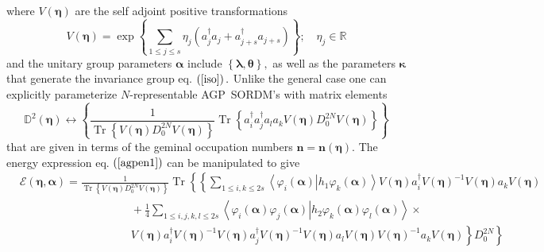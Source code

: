 \documentclass[aps,preprint]{revtex4}%
\begin{document}
where $V\left(  \mathbf{\eta}\right)  $ are the self adjoint positive
transformations
\begin{equation}
V\left(  \mathbf{\eta}\right)  =\exp\left\{  \sum_{1\leq j\leq s}\eta
_{j}\left(  a_{j}^{\dagger}a_{j}+a_{j+s}^{\dagger}a_{j+s}\right)  \right\}
;\quad\eta_{j}\in\mathbb{R}%
\end{equation}
and the unitary group parameters $\mathbf{\alpha}$ include $\left\{
\mathbf{\lambda},\mathbf{\theta}\right\}  ,$ as well as the parameters
$\mathbf{\kappa}$ that generate the invariance group eq. $\left(
\ref{iso}\right)  .$ Unlike the general case one can explicitly parameterize
$N$-representable AGP\ SORDM's with matrix elements
\begin{equation}
\mathbb{D}^{2}\left(  \mathbf{\eta}\right)  \leftrightarrow\left\{  \frac
{1}{\operatorname{Tr}\left\{  V\left(  \mathbf{\eta}\right)  D_{0}%
^{2N}V\left(  \mathbf{\eta}\right)  \right\}  }\operatorname{Tr}\left\{
a_{i}^{\dagger}a_{j}^{\dagger}a_{l}a_{k}V\left(  \mathbf{\eta}\right)
D_{0}^{2N}V\left(  \mathbf{\eta}\right)  \right\}  \right\}
\end{equation}
that are given in terms of the geminal occupation numbers $\mathbf{n}%
=\mathbf{n}\left(  \mathbf{\eta}\right)  .$ The energy expression eq. $\left(
\ref{agpen1}\right)  $ can be manipulated to give%
\begin{align}
&  \mathcal{E}\left(  \mathbf{\eta,\alpha}\right)  =\frac{1}{\operatorname{Tr}%
\left\{  V\left(  \mathbf{\eta}\right)  D_{0}^{2N}V\left(  \mathbf{\eta
}\right)  \right\}  }\operatorname{Tr}\left\{  \left\{  \sum_{1\leq i,k\leq
2s}\left\langle \left.  \varphi_{i}\left(  \mathbf{\alpha}\right)  \right\vert
h_{1}\varphi_{k}\left(  \mathbf{\alpha}\right)  \right\rangle V\left(
\mathbf{\eta}\right)  a_{i}^{\dagger}V\left(  \mathbf{\eta}\right)
^{-1}V\left(  \mathbf{\eta}\right)  a_{k}V\left(  \mathbf{\eta}\right)
\right.  \right. \nonumber\\
&  \qquad\qquad\qquad\qquad\qquad+\frac{1}{4}\sum_{1\leq i,j,k,l\leq
2s}\left\langle \left.  \varphi_{i}\left(  \mathbf{\alpha}\right)  \varphi
_{j}\left(  \mathbf{\alpha}\right)  \right\vert h_{2}\varphi_{k}\left(
\mathbf{\alpha}\right)  \varphi_{l}\left(  \mathbf{\alpha}\right)
\right\rangle \times\\
&  \qquad\qquad\qquad\qquad\qquad\left.  \left.  V\left(  \mathbf{\eta
}\right)  a_{i}^{\dagger}V\left(  \mathbf{\eta}\right)  ^{-1}V\left(
\mathbf{\eta}\right)  a_{j}^{\dagger}V\left(  \mathbf{\eta}\right)
^{-1}V\left(  \mathbf{\eta}\right)  a_{l}V\left(  \mathbf{\eta}\right)
V\left(  \mathbf{\eta}\right)  ^{-1}a_{k}V\left(  \mathbf{\eta}\right)
\right\}  D_{0}^{2N}\right\}
\end{align}%
\end{document}
